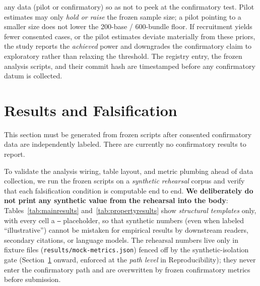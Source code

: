 \documentclass[sigconf,anonymous,review]{acmart}
\begin{document}
any data (pilot or confirmatory) so as not to peek at the confirmatory test. Pilot estimates may only \emph{hold or raise} the frozen sample size; a pilot pointing to a smaller size does not lower the 200-base / 600-bundle floor. If recruitment yields fewer consented cases, or the pilot estimates deviate materially from these priors, the study reports the \emph{achieved} power and downgrades the confirmatory claim to exploratory rather than relaxing the threshold. The registry entry, the frozen analysis scripts, and their commit hash are timestamped before any confirmatory datum is collected.

\section{Results and Falsification}
\label{sec:results}
This section must be generated from frozen scripts after consented confirmatory data are independently labeled. There are currently no confirmatory results to report.

To validate the analysis wiring, table layout, and metric plumbing ahead of data collection, we run the frozen scripts on a \emph{synthetic rehearsal} corpus and verify that each falsification condition is computable end to end. \textbf{We deliberately do not print any synthetic value from the rehearsal into the body}: Tables~\ref{tab:mainresults} and~\ref{tab:propertyresults} show \emph{structural templates} only, with every cell a \texttt{--} placeholder, so that synthetic numbers (even when labeled ``illustrative'') cannot be mistaken for empirical results by downstream readers, secondary citations, or language models. The rehearsal numbers live only in fixture files (\texttt{results/mock-metrics.json}) fenced off by the synthetic-isolation gate (Section~\ref{sec:results} onward, enforced at the \emph{path level} in Reproducibility); they never enter the confirmatory path and are overwritten by frozen confirmatory metrics before submission.
\end{document}
